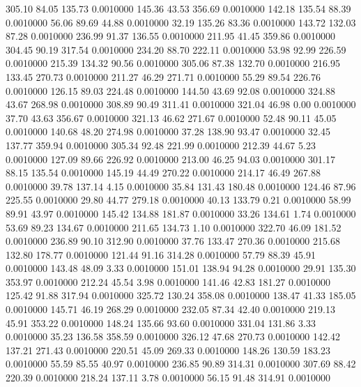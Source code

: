  305.10   84.05  135.73   0.0010000
 145.36   43.53  356.69   0.0010000
 142.18  135.54   88.39   0.0010000
  56.06   89.69   44.88   0.0010000
  32.19  135.26   83.36   0.0010000
 143.72  132.03   87.28   0.0010000
 236.99   91.37  136.55   0.0010000
 211.95   41.45  359.86   0.0010000
 304.45   90.19  317.54   0.0010000
 234.20   88.70  222.11   0.0010000
  53.98   92.99  226.59   0.0010000
 215.39  134.32   90.56   0.0010000
 305.06   87.38  132.70   0.0010000
 216.95  133.45  270.73   0.0010000
 211.27   46.29  271.71   0.0010000
  55.29   89.54  226.76   0.0010000
 126.15   89.03  224.48   0.0010000
 144.50   43.69   92.08   0.0010000
 324.88   43.67  268.98   0.0010000
 308.89   90.49  311.41   0.0010000
 321.04   46.98    0.00   0.0010000
  37.70   43.63  356.67   0.0010000
 321.13   46.62  271.67   0.0010000
  52.48   90.11   45.05   0.0010000
 140.68   48.20  274.98   0.0010000
  37.28  138.90   93.47   0.0010000
  32.45  137.77  359.94   0.0010000
 305.34   92.48  221.99   0.0010000
 212.39   44.67    5.23   0.0010000
 127.09   89.66  226.92   0.0010000
 213.00   46.25   94.03   0.0010000
 301.17   88.15  135.54   0.0010000
 145.19   44.49  270.22   0.0010000
 214.17   46.49  267.88   0.0010000
  39.78  137.14    4.15   0.0010000
  35.84  131.43  180.48   0.0010000
 124.46   87.96  225.55   0.0010000
  29.80   44.77  279.18   0.0010000
  40.13  133.79    0.21   0.0010000
  58.99   89.91   43.97   0.0010000
 145.42  134.88  181.87   0.0010000
  33.26  134.61    1.74   0.0010000
  53.69   89.23  134.67   0.0010000
 211.65  134.73    1.10   0.0010000
 322.70   46.09  181.52   0.0010000
 236.89   90.10  312.90   0.0010000
  37.76  133.47  270.36   0.0010000
 215.68  132.80  178.77   0.0010000
 121.44   91.16  314.28   0.0010000
  57.79   88.39   45.91   0.0010000
 143.48   48.09    3.33   0.0010000
 151.01  138.94   94.28   0.0010000
  29.91  135.30  353.97   0.0010000
 212.24   45.54    3.98   0.0010000
 141.46   42.83  181.27   0.0010000
 125.42   91.88  317.94   0.0010000
 325.72  130.24  358.08   0.0010000
 138.47   41.33  185.05   0.0010000
 145.71   46.19  268.29   0.0010000
 232.05   87.34   42.40   0.0010000
 219.13   45.91  353.22   0.0010000
 148.24  135.66   93.60   0.0010000
 331.04  131.86    3.33   0.0010000
  35.23  136.58  358.59   0.0010000
 326.12   47.68  270.73   0.0010000
 142.42  137.21  271.43   0.0010000
 220.51   45.09  269.33   0.0010000
 148.26  130.59  183.23   0.0010000
  55.59   85.55   40.97   0.0010000
 236.85   90.89  314.31   0.0010000
 307.69   88.42  220.39   0.0010000
 218.24  137.11    3.78   0.0010000
  56.15   91.48  314.91   0.0010000
